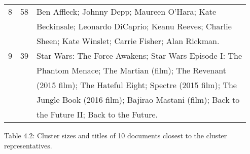 \begin{table}
\begin{tabular}{r r l}
8 & 58 & Ben Affleck; Johnny Depp; Maureen O’Hara; Kate \\  & & Beckinsale; Leonardo DiCaprio; Keanu Reeves; Charlie \\  & & Sheen; Kate Winslet; Carrie Fisher; Alan Rickman. \\
9 & 39 & Star Wars: The Force Awakens; Star Wars Episode I: The \\  & & Phantom Menace; The Martian (film); The Revenant \\  & & (2015 film); The Hateful Eight; Spectre (2015 film); The \\  & & Jungle Book (2016 film); Bajirao Mastani (film); Back to \\  & & the Future II; Back to the Future. \\ \hline \hline \end{tabular}
\end{table}
Table 4.2: Cluster sizes and titles of 10 documents closest to the cluster representatives.

